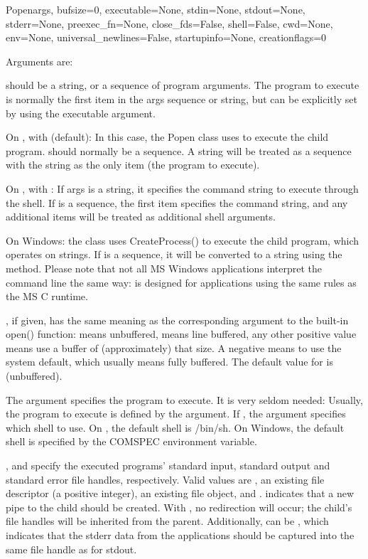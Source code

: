 \begin{classdesc}{Popen}{args, bufsize=0, executable=None,
            stdin=None, stdout=None, stderr=None,
            preexec_fn=None, close_fds=False, shell=False,
            cwd=None, env=None, universal_newlines=False,
            startupinfo=None, creationflags=0}

Arguments are:

 should be a string, or a sequence of program arguments.  The
program to execute is normally the first item in the args sequence or
string, but can be explicitly set by using the executable argument.

On \UNIX{}, with  (default): In this case, the Popen
class uses  to execute the child program.
 should normally be a sequence.  A string will be treated as a
sequence with the string as the only item (the program to execute).

On \UNIX{}, with : If args is a string, it specifies the
command string to execute through the shell.  If  is a
sequence, the first item specifies the command string, and any
additional items will be treated as additional shell arguments.

On Windows: the  class uses CreateProcess() to execute
the child program, which operates on strings.  If  is a
sequence, it will be converted to a string using the
 method.  Please note that not all MS Windows
applications interpret the command line the same way:
 is designed for applications using the same
rules as the MS C runtime.

, if given, has the same meaning as the corresponding
argument to the built-in open() function:  means unbuffered,
 means line buffered, any other positive value means use a
buffer of (approximately) that size.  A negative  means to
use the system default, which usually means fully buffered.  The default
value for  is  (unbuffered).

The  argument specifies the program to execute. It is
very seldom needed: Usually, the program to execute is defined by the
 argument. If , the 
argument specifies which shell to use. On \UNIX{}, the default shell
is /bin/sh.  On Windows, the default shell is specified by the COMSPEC
environment variable.

,  and  specify the executed
programs' standard input, standard output and standard error file
handles, respectively.  Valid values are , an existing file
descriptor (a positive integer), an existing file object, and
.   indicates that a new pipe to the child
should be created.  With , no redirection will occur; the
child's file handles will be inherited from the parent.  Additionally,
 can be , which indicates that the stderr
data from the applications should be captured into the same file
handle as for stdout.


\end{classdesc}
